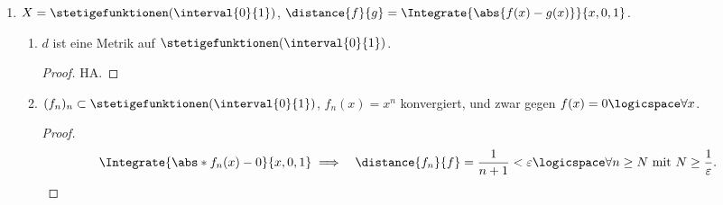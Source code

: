 \begin{beispiele}
\begin{enumerate}
\begin{enumerate}[label=\textbf{\arabic*. Beh}]
        \end{enumerate}
        \item \( X=\stetigefunktionen(\interval{0}{1}) \), \( \distance{f}{g}=\Integrate{\abs{f(x)-g(x)}}{x,0,1} \).
        \begin{enumerate}[label=\textbf{\arabic*. Beh}]
            
            \item \( d \) ist eine Metrik auf \( \stetigefunktionen(\interval{0}{1}) \).
            \begin{proof}
                HA\@.
            \end{proof}
            
            \item \( (f_n)_n\subset \stetigefunktionen(\interval{0}{1}) \), \( f_n(x)=x^n \) konvergiert, und zwar gegen \( f(x)=0\logicspace\forall x \).
            \begin{proof}
                \begin{align*}
                    &\Integrate{\abs*{f_n(x)-0}}{x,0,1}%
                    \implies &\distance{f_n}{f}=\frac{1}{n+1}<\varepsilon\logicspace\forall n\geq N \text{ mit } N \geq \frac{1}{\varepsilon}.
                \end{align*}
            \end{proof}
            
        \end{enumerate}
        
    \end{enumerate}
\end{beispiele}
